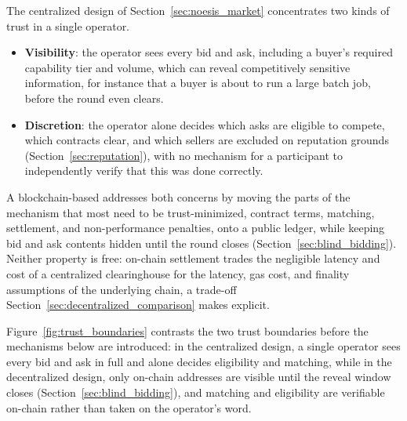 The centralized design of Section~\ref{sec:noesis_market} concentrates two
kinds of trust in a single operator.

\begin{itemize}
  \item \textbf{Visibility}: the operator sees every bid and ask,
    including a buyer's required capability tier and volume, which can
    reveal competitively sensitive information, for instance that a
    buyer is about to run a large batch job, before the round even
    clears.
  \item \textbf{Discretion}: the operator alone decides which asks are
    eligible to compete, which contracts clear, and which sellers are
    excluded on reputation grounds (Section~\ref{sec:reputation}), with
    no mechanism for a participant to independently verify that this was
    done correctly.
\end{itemize}

A blockchain-based \NoesisMarket{} addresses both concerns by moving the
parts of the mechanism that most need to be trust-minimized, contract
terms, matching, settlement, and non-performance penalties, onto a public
ledger, while keeping bid and ask contents hidden until the round closes
(Section~\ref{sec:blind_bidding}). Neither property is free: on-chain
settlement trades the negligible latency and cost of a centralized
clearinghouse for the latency, gas cost, and finality assumptions of the
underlying chain, a trade-off Section~\ref{sec:decentralized_comparison}
makes explicit.

Figure~\ref{fig:trust_boundaries} contrasts the two trust boundaries
before the mechanisms below are introduced: in the centralized design, a
single operator sees every bid and ask in full and alone decides
eligibility and matching, while in the decentralized design, only
on-chain addresses are visible until the reveal window closes
(Section~\ref{sec:blind_bidding}), and matching and eligibility are
verifiable on-chain rather than taken on the operator's word.

